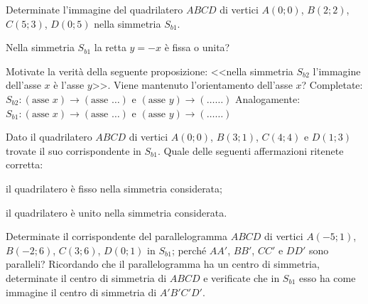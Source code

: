 \begin{esercizio}
	\label{ese:8.33} %
	Determinate l'immagine del quadrilatero \(ABCD\) di vertici \(A(0;0)\), 
	\(B(2;2)\), \(C(5;3)\), \(D(0;5)\) nella simmetria \(S_{b1}\).
\end{esercizio}

\begin{esercizio}
	\label{ese:8.34} %
	Nella simmetria \(S_{b1}\) la retta \(y=-x\) è fissa o unita?
\end{esercizio}

\begin{esercizio}
	\label{ese:8.35} %
	Motivate la verità della seguente proposizione: <<nella simmetria 
	\(S_{b2}\) l'immagine dell'asse \(x\) è l'asse \(y\)>>. Viene mantenuto 
	l'orientamento dell'asse \(x\)?
	Completate: \(S_{b2}:(\text{asse }x)\rightarrow (\text{asse } 
	\ldots{})\) e \((\text{asse }y)\rightarrow(\ldots\ldots{})\)
	Analogamente: \(S_{b1}:(\text{asse }x)\rightarrow (\text{asse } 
	\ldots{})\) e \((\text{asse }y)\rightarrow(\ldots\ldots{})\)
\end{esercizio}

\begin{esercizio}
	\label{ese:8.36} %
	Dato il quadrilatero \(ABCD\) di vertici \(A(0;0)\), \(B(3;1)\), \(C(4;4)\) e 
	\(D(1;3)\) trovate il suo corrispondente in \(S_{b1}\). Quale delle 
	seguenti affermazioni ritenete corretta:
	\begin{enumeratea}
		\item il quadrilatero è fisso nella simmetria considerata;
		\item il quadrilatero è unito nella simmetria considerata.
	\end{enumeratea}
\end{esercizio}

\begin{esercizio}
	\label{ese:8.37} %
	Determinate il corrispondente del parallelogramma \(ABCD\) di vertici 
	\(A(-5;1)\), \(B(-2;6)\), \(C(3;6)\), \(D(0;1)\) in \(S_{b1}\); perché \(AA'\), 
	\(BB'\), \(CC'\) e \(DD'\) sono paralleli? Ricordando che il 
	parallelogramma ha un centro di simmetria, determinate il centro di 
	simmetria di \(ABCD\) e verificate che in \(S_{b1}\) esso ha come immagine 
	il centro di simmetria di \(A'B'C'D'\).
\end{esercizio}

